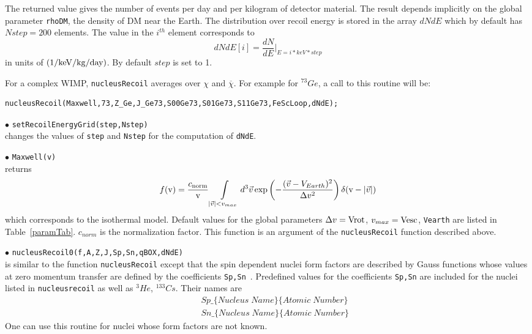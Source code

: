 \documentclass[12pt,a4paper]{article}
\begin{document}
The returned value gives the number of events per day and per kilogram of 
detector material. The  result depends  implicitly on the  global  parameter \verb|rhoDM|, the
density of DM near the Earth.
The distribution over recoil energy is stored in the array 
$dNdE$ which by default has $Nstep=200$ elements.  
The value in the $i^{th}$ element corresponds to
$$
dNdE[i] = \frac{dN}{dE}|_{E=i*keV*step}
$$
in units of ${\rm (1/keV/kg/day)}$. By default $step$  is set to 1. 

For a complex WIMP, \verb|nucleusRecoil| averages over $\chi$ and
$\overline{\chi}$. For example for $^{73}Ge$, a call to this routine will be: 
\begin{verbatim}
nucleusRecoil(Maxwell,73,Z_Ge,J_Ge73,S00Ge73,S01Ge73,S11Ge73,FeScLoop,dNdE);
\end{verbatim}


\noindent
$\bullet$ \verb|setRecoilEnergyGrid(step,Nstep)| \\
changes the values of \verb|step| and \verb|Nstep| for the computation of \verb|dNdE|.


\noindent
$\bullet$ \verb|Maxwell(v)| \\
returns   
$$f(\mbox{v})= \frac{c_{\rm{norm}}}{\mbox{v}}\int\limits_{|\vec{v}|<v_{max}} d^3\vec{v} \exp\left(
-\frac{(\vec{v}-V_{Earth})^2}{\Delta v^2}\right)\delta(\mbox{v} -|\vec{v}|)
$$
which corresponds to the isothermal model. Default values for the global parameters 
$\Delta v ={\rm Vrot}$,  $v_{max}={\rm Vesc}$, \verb|Vearth| are listed in Table~\ref{paramTab}.
$c_{norm}$ is the normalization factor.  This function is an
argument of the \verb|nucleusRecoil| function described above.


\noindent
$\bullet$ \verb|nucleusRecoil0(f,A,Z,J,Sp,Sn,qBOX,dNdE)|\\
is similar to the  function \verb|nucleusRecoil| except that 
the spin dependent nuclei form factors are described by Gauss functions
whose values  at zero momentum transfer are defined by the coefficients \verb|Sp,Sn|~\cite{Belanger:2008sj}. 
Predefined values for the coefficients \verb|Sp,Sn| are included for the
nuclei listed in \verb|nucleusrecoil| as well as ${}^3He$, ${}^{133}Cs$. Their  names are 
\begin{eqnarray}
    &&Sp\_\{Nucleus\; Name\}\{Atomic \;Number\} \nonumber\\
    &&Sn\_\{Nucleus\; Name\}\{Atomic\; Number\} \nonumber
\end{eqnarray}
One can use this routine for nuclei whose form factors  are not known. 
\end{document}
